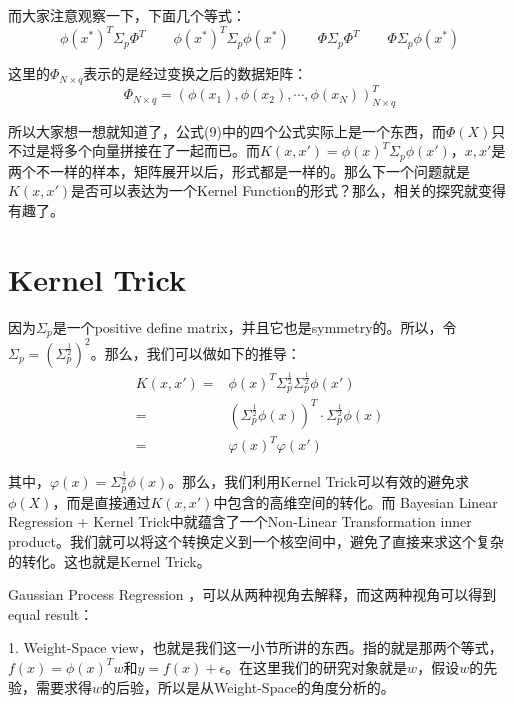 \documentclass[a4paper]{article}
\begin{document}
而大家注意观察一下，下面几个等式：
\begin{equation}
    \phi(x^\ast)^T\Sigma_p\Phi^T \qquad \phi(x^\ast)^T\Sigma_p\phi(x^\ast) \qquad
    \Phi\Sigma_p\Phi^T \qquad
    \Phi\Sigma_p\phi(x^\ast) 
\end{equation}

这里的$\Phi_{N\times q}$表示的是经过变换之后的数据矩阵：
\begin{equation}
    \Phi_{N\times q} = (\phi(x_1),\phi(x_2),\cdots,\phi(x_N))^T_{N\times q}
\end{equation}

所以大家想一想就知道了，公式(9)中的四个公式实际上是一个东西，而$\Phi(X)$只不过是将多个向量拼接在了一起而已。而$K(x,x')=\phi(x)^T\Sigma_p\phi(x')$，$x,x'$是两个不一样的样本，矩阵展开以后，形式都是一样的。那么下一个问题就是$K(x,x')$是否可以表达为一个Kernel Function的形式？那么，相关的探究就变得有趣了。

\section{Kernel Trick}
因为$\Sigma_p$是一个positive define matrix，并且它也是symmetry的。所以，令$\Sigma_p = (\Sigma_p^{\frac{1}{2}})^2$。那么，我们可以做如下的推导：
\begin{equation}
    \begin{split}
        K(x,x') 
        = & \phi(x)^T\Sigma_p^{\frac{1}{2}}\Sigma_p^{\frac{1}{2}}\phi(x') \\
        = & (\Sigma_p^{\frac{1}{2}}\phi(x))^T\cdot \Sigma_p^{\frac{1}{2}}\phi(x) \\
        = & \varphi(x)^T\varphi(x')
    \end{split}
\end{equation}

其中，$\varphi(x) = \Sigma_p^{\frac{1}{2}}\phi(x)$。那么，我们利用Kernel Trick可以有效的避免求$\phi(X)$，而是直接通过$K(x,x')$中包含的高维空间的转化。而{\color{red} Bayesian Linear Regression + Kernel Trick中就蕴含了一个Non-Linear Transformation inner product。}我们就可以将这个转换定义到一个核空间中，避免了直接来求这个复杂的转化。这也就是Kernel Trick。

Gaussian Process Regression ，可以从两种视角去解释，而这两种视角可以得到equal result：

1. Weight-Space view，也就是我们这一小节所讲的东西。指的就是那两个等式，$f(x) = \phi(x)^Tw$和$y=f(x)+\epsilon$。在这里我们的研究对象就是$w$，假设$w$的先验，需要求得$w$的后验，所以是从Weight-Space的角度分析的。
\end{document}
